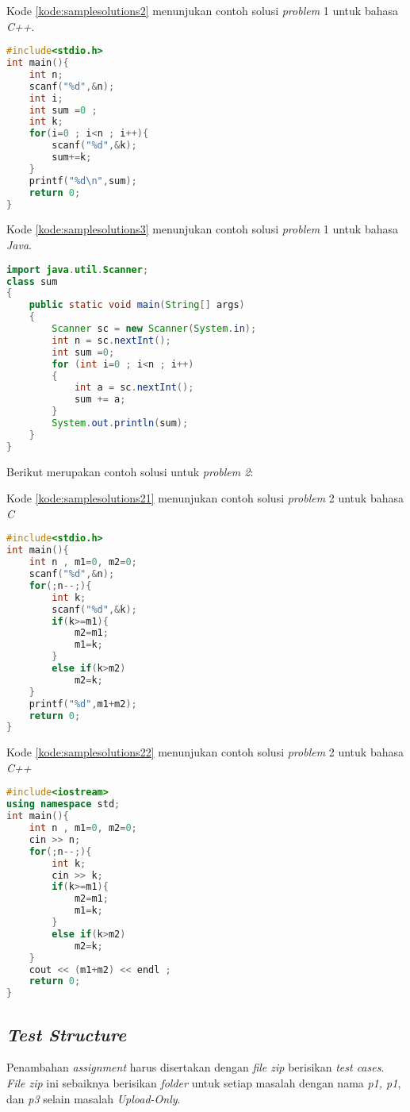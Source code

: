 Kode \ref{kode:samplesolutions2} menunjukan contoh solusi \textit{problem} 1 untuk bahasa \textit{C++}.
\begin{lstlisting}[language=C++, caption=Contoh solusi \textit{problem} 1 bahasa \textit{C++}, label=kode:samplesolutions2]
#include<stdio.h>
int main(){
	int n;
	scanf("%d",&n);
	int i;
	int sum =0 ;
	int k;
	for(i=0 ; i<n ; i++){
		scanf("%d",&k);
		sum+=k;
	}
	printf("%d\n",sum);
	return 0;
}
\end{lstlisting}

Kode \ref{kode:samplesolutions3} menunjukan contoh solusi \textit{problem} 1 untuk bahasa \textit{Java}.
\begin{lstlisting}[language=Java,  caption=Contoh solusi \textit{problem} 1 bahasa \textit{Java}, label=kode:samplesolutions3]
import java.util.Scanner;
class sum
{
	public static void main(String[] args)
	{ 
		Scanner sc = new Scanner(System.in);
		int n = sc.nextInt();
		int sum =0;
		for (int i=0 ; i<n ; i++)
		{
			int a = sc.nextInt();
			sum += a;
		}
		System.out.println(sum); 
	}
}
\end{lstlisting}

Berikut merupakan contoh solusi untuk \textit{problem 2}:

Kode \ref{kode:samplesolutions21} menunjukan contoh solusi \textit{problem} 2 untuk bahasa \textit{C}
\begin{lstlisting}[language=C, caption=Contoh solusi \textit{problem} 2 bahasa \textit{C}, label=kode:samplesolutions21]
#include<stdio.h>
int main(){
	int n , m1=0, m2=0;
	scanf("%d",&n);
	for(;n--;){
		int k;
		scanf("%d",&k);
		if(k>=m1){
			m2=m1;
			m1=k;
		}
		else if(k>m2)
			m2=k;
	}
	printf("%d",m1+m2);
	return 0;
}
\end{lstlisting}

Kode \ref{kode:samplesolutions22} menunjukan contoh solusi \textit{problem} 2 untuk bahasa \textit{C++}
\begin{lstlisting}[language=C++, caption=Contoh solusi \textit{problem} 2 bahasa \textit{C++}, label=kode:samplesolutions22]
#include<iostream>
using namespace std;
int main(){
	int n , m1=0, m2=0;
	cin >> n;
	for(;n--;){
		int k;
		cin >> k;
		if(k>=m1){
			m2=m1;
			m1=k;
		}
		else if(k>m2)
			m2=k;
	}
	cout << (m1+m2) << endl ;
	return 0;
}
\end{lstlisting}

\subsection{\textit{Test Structure}}
\label{subsec:testStructure}
Penambahan \textit{assignment} harus disertakan dengan \textit{file zip} berisikan \textit{test cases}. \textit{File zip} ini sebaiknya berisikan \textit{folder} untuk setiap masalah dengan nama \textit{p1, p1}, dan \textit{p3} selain masalah \textit{Upload-Only}.

